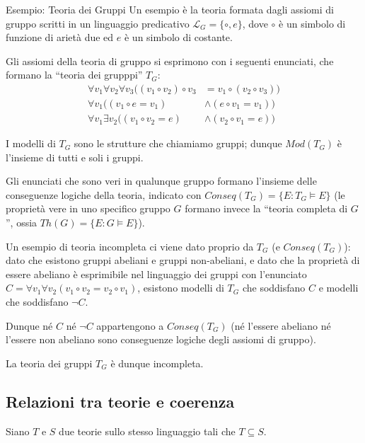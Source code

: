 \documentclass[a4paper,11pt]{report}
\begin{document}
\begin{gframe}{Esempio: Teoria dei Gruppi}
Un esempio è la teoria formata dagli assiomi di gruppo scritti in un linguaggio predicativo \( \mathcal{L}_G = \{ \circ, e \} \), dove \( \circ \) è un simbolo di funzione di arietà due ed \( e \) è un simbolo di costante.

Gli assiomi della teoria di gruppo si esprimono con i seguenti enunciati, che formano la ``teoria dei grupppi'' \( T_G \):
\begin{align*}
\forall v_1 \forall v_2 \forall v_3 ((v_1 \circ v_2) \circ v_3 &= v_1 \circ (v_2 \circ v_3)) \\
\forall v_1 ((v_1 \circ e = v_1) &\land (e \circ v_1 = v_1)) \\
\forall v_1 \exists v_2 ((v_1 \circ v_2 = e) &\land (v_2 \circ v_1 = e))
\end{align*}

I modelli di \( T_G \) sono le strutture che chiamiamo gruppi; dunque \( Mod(T_G) \) è l'insieme di tutti e soli i gruppi.

Gli enunciati che sono veri in qualunque gruppo formano l'insieme delle conseguenze logiche della teoria, indicato con \( Conseq(T_G) = \{E : T_G \models E\} \)
(le proprietà vere in uno specifico gruppo \( G \) formano invece la ``teoria completa di \( G \)'', ossia \( Th(G) = \{E : G \models E\} \)).

Un esempio di teoria incompleta ci viene dato proprio da \( T_G \) (e \( Conseq(T_G) \)): dato che esistono gruppi abeliani e gruppi non-abeliani, e dato che la proprietà di essere abeliano è esprimibile nel linguaggio dei gruppi con l'enunciato \( C = \forall v_1 \forall v_2 (v_1 \circ v_2 = v_2 \circ v_1) \), esistono modelli di \( T_G \) che soddisfano \( C \) e modelli che soddisfano \( \neg C \).

Dunque né \( C \) né \( \neg C \) appartengono a \( Conseq(T_G) \) (né l'essere abeliano né l'essere non abeliano sono conseguenze logiche degli assiomi di gruppo).

La teoria dei gruppi \( T_G \) è dunque incompleta.
\end{gframe}

\subsection*{Relazioni tra teorie e coerenza}

Siano \( T \) e \( S \) due teorie sullo stesso linguaggio tali che \( T \subseteq S \).
\end{document}
